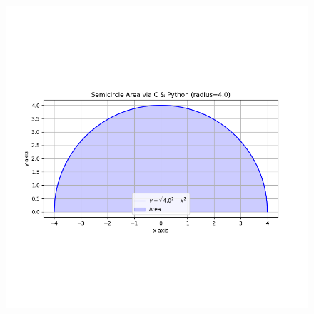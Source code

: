 \documentclass[article]{IEEEtran}
\begin{document}
\begin{figure}[H]
	\centering
	\includegraphics[width=1.1\linewidth]{figs/semicircle_plot_from_c}
	\caption{}
	\label{fig:semicircleplotfromc}
\end{figure}
\end{document}
